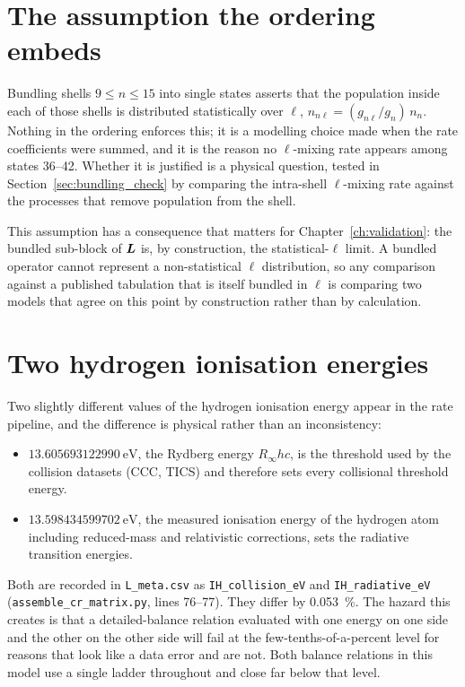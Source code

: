 \section{The assumption the ordering embeds}

Bundling shells $9 \le n \le 15$ into single states asserts that the population
inside each of those shells is distributed statistically over $\ell$,
$n_{n\ell} = (g_{n\ell}/g_n)\,n_n$. Nothing in the ordering enforces this; it is
a modelling choice made when the rate coefficients were summed, and it is the
reason no $\ell$-mixing rate appears among states 36--42. Whether it is
justified is a physical question, tested in Section~\ref{sec:bundling_check} by
comparing the intra-shell $\ell$-mixing rate against the processes that remove
population from the shell.

This assumption has a consequence that matters for Chapter~\ref{ch:validation}:
the bundled sub-block of $\bm{L}$ is, by construction, the statistical-$\ell$
limit. A bundled operator cannot represent a non-statistical $\ell$
distribution, so any comparison against a published tabulation that is itself
bundled in $\ell$ is comparing two models that agree on this point by
construction rather than by calculation.

\section{Two hydrogen ionisation energies}

Two slightly different values of the hydrogen ionisation energy appear in the
rate pipeline, and the difference is physical rather than an inconsistency:

\begin{itemize}
  \item $\SI{13.605693122990}{\electronvolt}$, the Rydberg energy $R_\infty hc$,
    is the threshold used by the collision datasets (CCC, TICS) and therefore
    sets every collisional threshold energy.
  \item $\SI{13.598434599702}{\electronvolt}$, the measured ionisation energy of
    the hydrogen atom including reduced-mass and relativistic corrections, sets
    the radiative transition energies.
\end{itemize}

\noindent Both are recorded in \texttt{L\_meta.csv} as
\texttt{IH\_collision\_eV} and \texttt{IH\_radiative\_eV}
(\texttt{assemble\_cr\_matrix.py}, lines 76--77). They differ by
\SI{0.053}{\percent}. The hazard this creates is that a detailed-balance
relation evaluated with one energy on one side and the other on the other side
will fail at the few-tenths-of-a-percent level for reasons that look like a data
error and are not. Both balance relations in this model use a single ladder
throughout and close far below that level.


